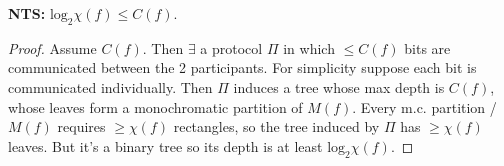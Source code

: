 \textbf{NTS:} $\text{log}_2 \chi(f) \leq C(f)$.
\begin{proof}
Assume $C(f)$. 
\pause
Then $\exists$ a protocol $\Pi$ in which $\leq C(f)$ bits are communicated
between the 2 participants. 
\pause 
For simplicity suppose each bit is communicated individually. 
\pause 
Then $\Pi$ induces a tree whose max depth is $C(f)$, whose leaves form a monochromatic partition of $M(f)$.
\pause  
Every m.c. partition / $M(f)$ requires $\geq \chi(f)$ rectangles, so the tree induced by $\Pi$ has $\geq \chi(f)$ leaves.
\pause  
But it's a binary tree so its depth is at least $\text{log}_2 \chi(f)$.
\end{proof}